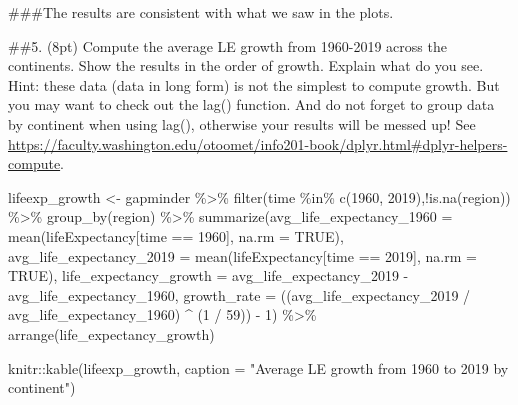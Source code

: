 \documentclass[
]{article}
\newenvironment{Shaded}{\begin{snugshade}}{\end{snugshade}}
\newcommand{\AttributeTok}[1]{\textcolor[rgb]{0.77,0.63,0.00}{#1}}
\newcommand{\ConstantTok}[1]{\textcolor[rgb]{0.00,0.00,0.00}{#1}}
\newcommand{\DecValTok}[1]{\textcolor[rgb]{0.00,0.00,0.81}{#1}}
\newcommand{\FunctionTok}[1]{\textcolor[rgb]{0.00,0.00,0.00}{#1}}
\newcommand{\NormalTok}[1]{#1}
\newcommand{\OtherTok}[1]{\textcolor[rgb]{0.56,0.35,0.01}{#1}}
\newcommand{\SpecialCharTok}[1]{\textcolor[rgb]{0.00,0.00,0.00}{#1}}
\newcommand{\StringTok}[1]{\textcolor[rgb]{0.31,0.60,0.02}{#1}}
\begin{document}
\#\#\#The results are consistent with what we saw in the plots.

\#\#5. (8pt) Compute the average LE growth from 1960-2019 across the
continents. Show the results in the order of growth. Explain what do you
see. Hint: these data (data in long form) is not the simplest to compute
growth. But you may want to check out the lag() function. And do not
forget to group data by continent when using lag(), otherwise your
results will be messed up! See
\url{https://faculty.washington.edu/otoomet/info201-book/dplyr.html\#dplyr-helpers-compute}.

\begin{Shaded}
\begin{Highlighting}[]
\NormalTok{lifeexp\_growth }\OtherTok{\textless{}{-}}\NormalTok{ gapminder }\SpecialCharTok{\%\textgreater{}\%} 
  \FunctionTok{filter}\NormalTok{(time }\SpecialCharTok{\%in\%} \FunctionTok{c}\NormalTok{(}\DecValTok{1960}\NormalTok{, }\DecValTok{2019}\NormalTok{),}\SpecialCharTok{!}\FunctionTok{is.na}\NormalTok{(region)) }\SpecialCharTok{\%\textgreater{}\%} 
  \FunctionTok{group\_by}\NormalTok{(region) }\SpecialCharTok{\%\textgreater{}\%} 
  \FunctionTok{summarize}\NormalTok{(}\AttributeTok{avg\_life\_expectancy\_1960 =} \FunctionTok{mean}\NormalTok{(lifeExpectancy[time }\SpecialCharTok{==} \DecValTok{1960}\NormalTok{], }\AttributeTok{na.rm =} \ConstantTok{TRUE}\NormalTok{),}
            \AttributeTok{avg\_life\_expectancy\_2019 =} \FunctionTok{mean}\NormalTok{(lifeExpectancy[time }\SpecialCharTok{==} \DecValTok{2019}\NormalTok{], }\AttributeTok{na.rm =} \ConstantTok{TRUE}\NormalTok{),}
            \AttributeTok{life\_expectancy\_growth =}\NormalTok{ avg\_life\_expectancy\_2019 }\SpecialCharTok{{-}}\NormalTok{ avg\_life\_expectancy\_1960,}
            \AttributeTok{growth\_rate =}\NormalTok{ ((avg\_life\_expectancy\_2019 }\SpecialCharTok{/}\NormalTok{ avg\_life\_expectancy\_1960) }\SpecialCharTok{\^{}}\NormalTok{ (}\DecValTok{1} \SpecialCharTok{/} \DecValTok{59}\NormalTok{)) }\SpecialCharTok{{-}} \DecValTok{1}\NormalTok{) }\SpecialCharTok{\%\textgreater{}\%} 
  \FunctionTok{arrange}\NormalTok{(life\_expectancy\_growth)}

\NormalTok{knitr}\SpecialCharTok{::}\FunctionTok{kable}\NormalTok{(lifeexp\_growth, }\AttributeTok{caption =} \StringTok{"Average LE growth from 1960 to 2019 by continent"}\NormalTok{)}
\end{Highlighting}
\end{Shaded}
\end{document}
